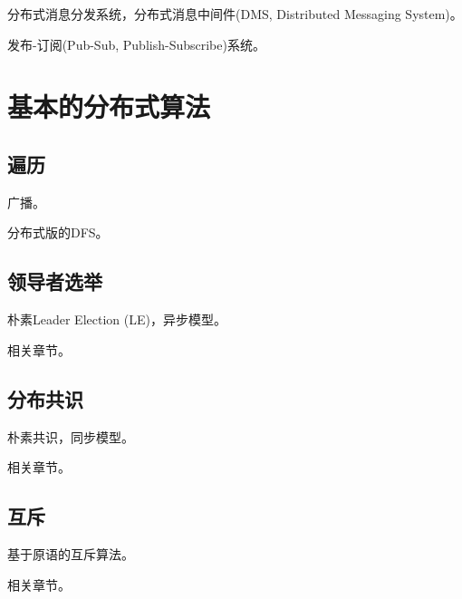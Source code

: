 分布式消息分发系统，分布式消息中间件(DMS, Distributed Messaging System)。

发布-订阅(Pub-Sub, Publish-Subscribe)系统。


\chapter{基本的分布式算法}

\section{遍历}

广播。

分布式版的DFS。

\section{领导者选举}

朴素Leader Election (LE)，异步模型。

\myleaf \cite{Attiya04}相关章节。\\

\section{分布共识}

朴素共识，同步模型。

\myleaf \cite{Attiya04}相关章节。


\section{互斥}

基于原语的互斥算法。

\myleaf \cite{Attiya04}相关章节。